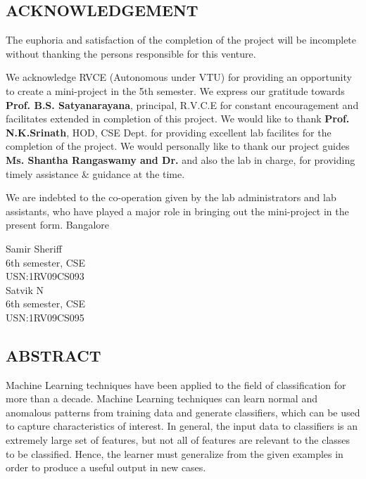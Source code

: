 \documentclass[12pt]{report}
\begin{document}
  
\setcounter{page}{1}
\begin{center}
\section*{ACKNOWLEDGEMENT}
\end{center}
The euphoria and satisfaction of the completion of the project will be incomplete
without thanking the persons responsible for this venture.


We acknowledge RVCE (Autonomous under VTU) for providing an opportunity to
create a mini-project in the 5th semester. We express our gratitude towards \textbf{Prof. B.S. Satyanarayana}, principal, R.V.C.E for constant encouragement and facilitates extended in completion of this project. We would like to thank \textbf{Prof. N.K.Srinath}, HOD, CSE
Dept. for providing excellent lab facilites for the completion of the project. We would
personally like to thank our project guides \textbf{Ms. Shantha Rangaswamy and Dr. } and also the lab in charge, for providing timely assistance \& guidance at the time.



We are indebted to the co-operation given by the lab administrators and lab assistants,
who have played a major role in bringing out the mini-project in the present form.
Bangalore



\begin{flushright}
Samir Sheriff\\
6th semester, CSE\\
USN:1RV09CS093\\

Satvik N\\
6th semester, CSE\\
USN:1RV09CS095\\

\end{flushright}

\newpage

\begin{center}
\section*{ABSTRACT}
\end{center} 
Machine Learning techniques have been applied to the field of classification for more than a decade. Machine Learning techniques can learn normal and anomalous patterns from training data and generate classifiers, which
can be used to capture characteristics of interest. In general, the input data to classifiers is an extremely large set of features, but not all of features are relevant to the classes to be classified.
Hence, the learner must generalize from the given examples in order to produce a useful output in new cases. 
\end{document}
